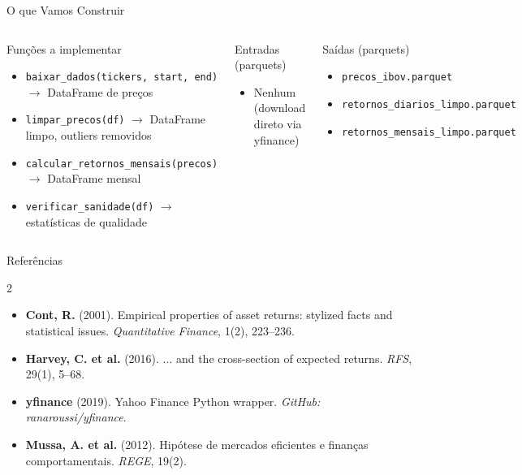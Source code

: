 \documentclass[aspectratio=169,12pt]{beamer}
\begin{document}
\begin{frame}[fragile]{O que Vamos Construir}
\begin{columns}[T]
\begin{block}{Funções a implementar}
\begin{itemize}
  \item \texttt{baixar\_dados(tickers, start, end)} $\to$ DataFrame de preços
  \item \texttt{limpar\_precos(df)} $\to$ DataFrame limpo, outliers removidos
  \item \texttt{calcular\_retornos\_mensais(precos)} $\to$ DataFrame mensal
  \item \texttt{verificar\_sanidade(df)} $\to$ estatísticas de qualidade
\end{itemize}
\end{block}
\begin{block}{Entradas (parquets)}
\begin{itemize}
  \item Nenhum (download direto via yfinance)
\end{itemize}
\end{block}
\vspace{.4em}
\begin{exampleblock}{Saídas (parquets)}
\begin{itemize}
  \item \texttt{precos\_ibov.parquet}
  \item \texttt{retornos\_diarios\_limpo.parquet}
  \item \texttt{retornos\_mensais\_limpo.parquet}
\end{itemize}
\end{exampleblock}
\end{columns}
\end{frame}

\begin{frame}[fragile]{Referências}
\begin{multicols}{2}
\tiny
\begin{itemize}
  \item \textbf{Cont, R.} (2001). Empirical properties of asset returns: stylized facts and statistical issues. \textit{Quantitative Finance}, 1(2), 223--236.
  \item \textbf{Harvey, C. et al.} (2016). ... and the cross-section of expected returns. \textit{RFS}, 29(1), 5--68.
  \item \textbf{yfinance} (2019). Yahoo Finance Python wrapper. \textit{GitHub: ranaroussi/yfinance}.
  \item \textbf{Mussa, A. et al.} (2012). Hipótese de mercados eficientes e finanças comportamentais. \textit{REGE}, 19(2).
\end{itemize}
\end{multicols}
\end{frame}
\end{document}
